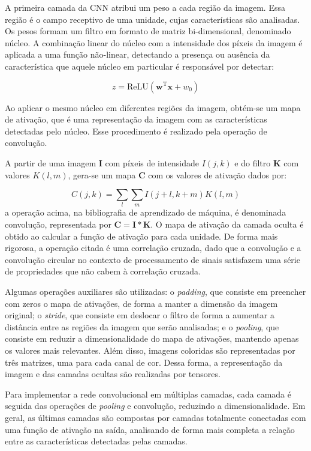 A primeira camada da CNN atribui um peso a cada região da imagem. Essa região é
o campo receptivo de uma unidade, cujas características são analisadas.
Os pesos formam um filtro em formato de matriz bi-dimensional, denominado
núcleo. A combinação linear do núcleo com a intensidade dos píxeis da imagem é
aplicada a uma função não-linear, detectando a presença ou ausência da
característica que aquele núcleo em particular é responsável por detectar:

\begin{equation}
    z = \text{ReLU}(\mathbf{w}^\text{T} \mathbf{x} + w_0)
\end{equation}

Ao aplicar o mesmo núcleo em diferentes regiões da imagem, obtém-se um mapa de
ativação, que é uma representação da imagem com as características detectadas
pelo núcleo. Esse procedimento é realizado pela operação de convolução.

A partir de uma imagem $\mathbf{I}$ com píxeis de intensidade $I(j, k)$
e do filtro $\mathbf{K}$ com valores $K(l, m)$, gera-se um mapa $\mathbf{C}$ com
os valores de ativação dados por:

\begin{equation}
    C(j, k) = \sum_{l} \sum_{m} I(j+l, k+m)K(l, m)
\end{equation}
a operação acima, na bibliografia de aprendizado de máquina, é denominada
convolução, representada por $\mathbf{C} = \mathbf{I} * \mathbf{K}$. O mapa de
ativação da camada oculta é obtido ao calcular a função de ativação para cada
unidade. De forma mais rigorosa, a operação citada é uma correlação cruzada, dado
que a convolução e a convolução circular no contexto de processamento de sinais
satisfazem uma série de propriedades que não cabem à correlação cruzada.

Algumas operações auxiliares são utilizadas: o \textit{padding}, que consiste em
preencher com zeros o mapa de ativações, de forma a manter a dimensão da imagem
original; o \textit{stride}, que consiste em deslocar o filtro de forma a
aumentar a distância entre as regiões da imagem que serão analisadas; e o
\textit{pooling}, que consiste em reduzir a dimensionalidade do mapa de
ativações, mantendo apenas os valores mais relevantes. Além disso, imagens
coloridas são representadas por três matrizes, uma para cada canal de cor. Dessa
forma, a representação da imagem e das camadas ocultas são realizadas por
tensores.

Para implementar a rede convolucional em múltiplas camadas, cada camada é
seguida das operações de \textit{pooling} e convolução, reduzindo a
dimensionalidade. Em geral, as últimas camadas são compostas por camadas
totalmente conectadas com uma função de ativação na saída, analisando de forma
mais completa a relação entre as características detectadas pelas camadas.

